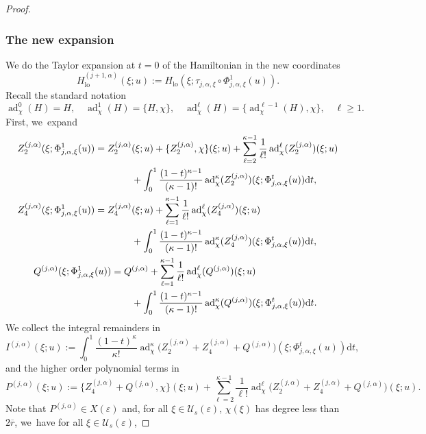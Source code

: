 \documentclass[10pt,a4paper]{amsart}
\theoremstyle{plain}
\theoremstyle{definition}
\DeclareMathOperator{\lo}{lo}
\newcommand{\1}{\mathbf{1}}
\let\epsilon\varepsilon
\begin{document}
\begin{proof}
\subsubsection*{The new expansion} We do the Taylor expansion at $t=0$ of the Hamiltonian
in the new coordinates
\[
H_{\lo}^{(j+1,\alpha)}(\xi;u):=H_{\lo}(\xi;\tau_{j,\alpha,\xi}\circ\Phi_{j,\alpha,\xi}^{1}(u)).
\]
Recall the standard notation
\[
\operatorname{ad}_{\chi}^{0}(H)=H,\quad \operatorname{ad}^{1}_{\chi}(H) = \{H,\chi\},\quad \operatorname{ad}^{\ell}_{\chi}(H) = \{\operatorname{ad}_{\chi}^{\ell-1}(H),\chi\},\quad \ell\geq1.
\]
First, we~expand
\begin{align}
\label{eq:exp2}
Z_{2}^{(j,\alpha)}(\xi;\Phi_{j,\alpha,\xi}^{1}(u))
= Z_{2}^{(j,\alpha)}&(\xi;u) + \{Z_{2}^{(j,\alpha)},\chi\}(\xi;u) + \sum_{\ell=2}^{\kappa-1}\frac{1}{\ell!}\operatorname{ad}_{\chi}^{\ell}(Z_{2}^{(j,\alpha)})(\xi;u)\\
&+ \int_{0}^{1}\frac{(1-t)^{\kappa-1}}{(\kappa-1)!}\operatorname{ad}_{\chi}^{\kappa}(Z_{2}^{(j,\alpha)})(\xi;\Phi_{j,\alpha,\xi}^{t}(u))\mathrm{d}t,\notag
\\
\label{eq:exp4}
Z_{4}^{(j,\alpha)}(\xi;\Phi_{j,\alpha,\xi}^{1}(u))
= Z_{4}^{(j,\alpha)}&(\xi;u) + \sum_{\ell=1}^{\kappa-1}\frac{1}{\ell!}\operatorname{ad}_{\chi}^{\ell}(Z_{4}^{(j,\alpha)})(\xi;u)\\
&+ \int_{0}^{1}\frac{(1-t)^{\kappa-1}}{(\kappa-1)!}\operatorname{ad}_{\chi}^{\kappa}(Z_{4}^{(j,\alpha)})(\xi;\Phi_{j,\alpha,\xi}^{t}(u))\mathrm{d}t,\notag
\\
\label{eq:expQ}
Q^{(j,\alpha)}(\xi;\Phi_{j,\alpha,\xi}^{1}(u))
= Q&^{(j,\alpha)} + \sum_{\ell=1}^{\kappa-1}\frac{1}{\ell!}\operatorname{ad}_{\chi}^{\ell}(Q^{(j,\alpha)})(\xi;u) \\
&+ \int_{0}^{1}\frac{(1-t)^{\kappa-1}}{(\kappa-1)!}\operatorname{ad}_{\chi}^{\kappa}(Q^{(j,\alpha)})(\xi;\Phi_{j,\alpha,\xi}^{t}(u))\mathrm{d}t.\notag
\end{align}
We collect the integral remainders in
\[
I^{(j,\alpha)}(\xi;u) := \int_{0}^{1}\frac{(1-t)^{\kappa}}{\kappa!}\operatorname{ad}_{\chi}^{\kappa}\big(Z_{2}^{(j,\alpha)} + Z_{4}^{(j,\alpha)}+ Q^{(j,\alpha)}\big)(\xi;\Phi_{j,\alpha,\xi}^{t}(u))\mathrm{d}t,
\]
and the higher order polynomial terms in
\[
P^{(j,\alpha)}(\xi;u) := \{Z_{4}^{(j,\alpha)}+Q^{(j,\alpha)},\chi\}(\xi;u)
+ \sum_{\ell=2}^{\kappa-1}\frac{1}{\ell!}\operatorname{ad}_{\chi}^{\ell}\big(Z_{2}^{(j,\alpha)}+Z_{4}^{(j,\alpha)}+Q^{(j,\alpha)}\big)(\xi;u).
\]
Note that $P^{(j,\alpha)}\in X(\epsilon)$ and, for all $\xi\in\mathcal{U}_{s}(\epsilon)$, $\chi(\xi)$ has degree less than $2\overline{r}$, we~have for all $\xi\in\mathcal{U}_{s}(\epsilon)$,

\end{proof}
\end{document}
